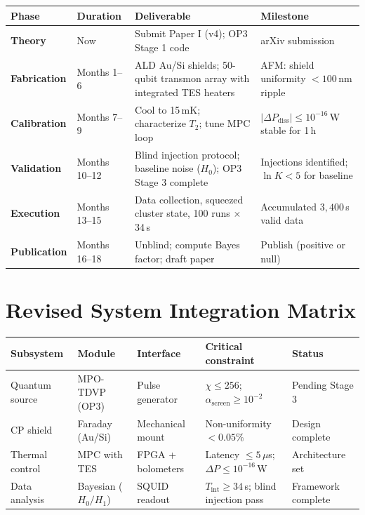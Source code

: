 \documentclass[11pt,letterpaper]{article}
\newcommand{\asc}{\alpha_{\mathrm{screen}}}
\begin{document}
\begin{center}\small
\begin{tabular}{@{}p{2cm}p{4cm}p{5cm}p{2.5cm}@{}}
\toprule
Phase & Duration & Deliverable & Milestone \\
\midrule
\textbf{Theory} & Now & Submit Paper I (v4); OP3 Stage 1 code & arXiv submission \\
\addlinespace
\textbf{Fabrication} & Months 1--6 & ALD Au/Si shields; 50-qubit transmon array with integrated TES heaters & AFM: shield uniformity $<100$\,nm ripple \\
\addlinespace
\textbf{Calibration} & Months 7--9 & Cool to 15\,mK; characterize $T_2$; tune MPC loop & $|\Delta P_{\mathrm{diss}}| \leq 10^{-16}$\,W stable for 1\,h \\
\addlinespace
\textbf{Validation} & Months 10--12 & Blind injection protocol; baseline noise ($H_0$); OP3 Stage 3 complete & Injections identified; $\ln K < 5$ for baseline \\
\addlinespace
\textbf{Execution} & Months 13--15 & Data collection, squeezed cluster state, 100 runs $\times$ 34\,s & Accumulated $3{,}400$\,s valid data \\
\addlinespace
\textbf{Publication} & Months 16--18 & Unblind; compute Bayes factor; draft paper & Publish (positive or null) \\
\bottomrule
\end{tabular}
\end{center}

\section{Revised System Integration Matrix}

\begin{center}\small
\begin{tabular}{@{}p{2.5cm}p{2.5cm}p{2.5cm}p{3.5cm}p{2cm}@{}}
\toprule
Subsystem & Module & Interface & Critical constraint & Status \\
\midrule
Quantum source & MPO-TDVP (OP3) & Pulse generator & $\chi \leq 256$; $\asc \geq 10^{-2}$ & Pending Stage 3 \\
CP shield & Faraday (Au/Si) & Mechanical mount & Non-uniformity $< 0.05\%$ & Design complete \\
Thermal control & MPC with TES & FPGA + bolometers & Latency $\leq 5\,\mu$s; $\Delta P \leq 10^{-16}$\,W & Architecture set \\
Data analysis & Bayesian ($H_0/H_1$) & SQUID readout & $T_{\mathrm{int}} \geq 34$\,s; blind injection pass & Framework complete \\
\bottomrule
\end{tabular}
\end{center}
\end{document}
